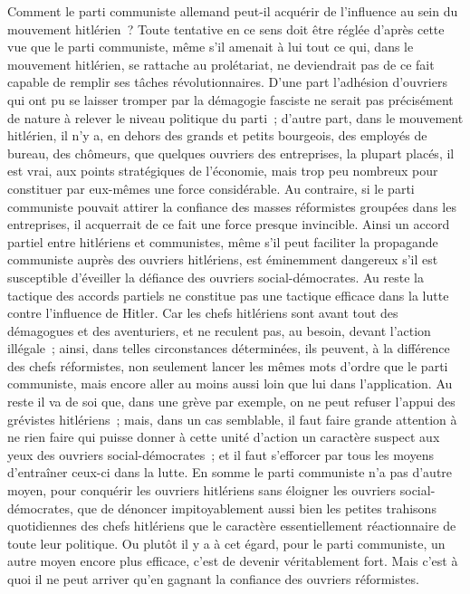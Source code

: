 \documentclass[french,twoside]{book} %
\begin{document}
Comment le parti communiste allemand peut-il acquérir de l'influence au sein du mouvement hitlérien ? Toute tentative en ce sens doit être réglée d'après cette vue que le parti communiste, même s'il amenait à lui tout ce qui, dans le mouvement hitlérien, se rattache au prolétariat, ne deviendrait pas de ce fait capable de remplir ses tâches révolutionnaires. D'une part l'adhésion d'ouvriers qui ont pu se laisser tromper par la démagogie fasciste ne serait pas précisément de nature à relever le niveau politique du parti ; d'autre part, dans le mouvement hitlérien, il n'y a, en dehors des grands et petits bourgeois, des employés de bureau, des chômeurs, que quelques ouvriers des entreprises, la plupart placés, il est vrai, aux points stratégiques de l'économie, mais trop peu nombreux pour constituer par eux-mêmes une force considérable. Au contraire, si le parti communiste pouvait attirer la confiance des masses réfor­mistes groupées dans les entreprises, il acquerrait de ce fait une force presque invincible. Ainsi un accord partiel entre hitlériens et communistes, même s'il peut faciliter la propagande communiste auprès des ouvriers hitlériens, est éminemment dangereux s'il est susceptible d'éveiller la défiance des ouvriers social-démocrates. Au reste la tactique des accords partiels ne constitue pas une tactique efficace dans la lutte contre l'influence de Hitler. Car les chefs hitlériens sont avant tout des démagogues et des aventuriers, et ne reculent pas, au besoin, devant l'action illégale ; ainsi, dans telles circonstances déter­minées, ils peuvent, à la différence des chefs réformistes, non seulement lancer les mêmes mots d'ordre que le parti communiste, mais encore aller au moins aussi loin que lui dans l'application. Au reste il va de soi que, dans une grève par exemple, on ne peut refuser l'appui des grévistes hitlériens ; mais, dans un cas semblable, il faut faire grande attention à ne rien faire qui puisse donner à cette unité d'action un caractère suspect aux yeux des ouvriers social-démocrates ; et il faut s'efforcer par tous les moyens d'entraîner ceux-ci dans la lutte. En somme le parti communiste n'a pas d'autre moyen, pour conquérir les ouvriers hitlériens sans éloigner les ouvriers social-démocrates, que de dénoncer impitoyablement aussi bien les petites trahisons quotidiennes des chefs hitlériens que le caractère essentiellement réactionnaire de toute leur politique. Ou plutôt il y a à cet égard, pour le parti communiste, un autre moyen encore plus efficace, c'est de devenir véritablement fort. Mais c'est à quoi il ne peut arriver qu'en gagnant la confiance des ouvriers réformistes.\par
\end{document}
